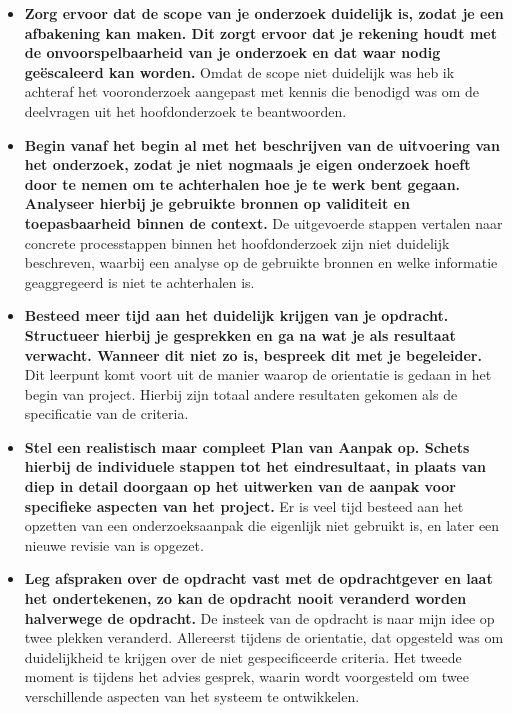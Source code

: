 \begin{itemize}
  \item \textbf{Zorg ervoor dat de scope van je onderzoek duidelijk is, zodat je een afbakening kan maken. Dit zorgt ervoor dat je rekening houdt met de onvoorspelbaarheid van je onderzoek en dat waar nodig geëscaleerd kan worden.} Omdat de scope niet duidelijk was heb ik achteraf het vooronderzoek aangepast met kennis die benodigd was om de deelvragen uit het hoofdonderzoek te beantwoorden.
  \item \textbf{Begin vanaf het begin al met het beschrijven van de uitvoering van het onderzoek, zodat je niet nogmaals je eigen onderzoek hoeft door te nemen om te achterhalen hoe je te werk bent gegaan. Analyseer hierbij je gebruikte bronnen op validiteit en toepasbaarheid binnen de context.} De uitgevoerde stappen vertalen naar concrete processtappen binnen het hoofdonderzoek zijn niet duidelijk beschreven, waarbij een analyse op de gebruikte bronnen en welke informatie geaggregeerd is niet te achterhalen is.
  \item \textbf{Besteed meer tijd aan het duidelijk krijgen van je opdracht. Structueer hierbij je gesprekken en ga na wat je als resultaat verwacht. Wanneer dit niet zo is, bespreek dit met je begeleider.} Dit leerpunt komt voort uit de manier waarop de orientatie is gedaan in het begin van project. Hierbij zijn totaal andere resultaten gekomen als de specificatie van de criteria.
  \item \textbf{Stel een realistisch maar compleet Plan van Aanpak op. Schets hierbij de individuele stappen tot het eindresultaat, in plaats van diep in detail doorgaan op het uitwerken van de aanpak voor specifieke aspecten van het project.} Er is veel tijd besteed aan het opzetten van een onderzoeksaanpak die eigenlijk niet gebruikt is, en later een nieuwe revisie van is opgezet.
  
  \newpage
  \item \textbf{Leg afspraken over de opdracht vast met de opdrachtgever en laat het ondertekenen, zo kan de opdracht nooit veranderd worden halverwege de opdracht.} De insteek van de opdracht is naar mijn idee op twee plekken veranderd. Allereerst tijdens de orientatie, dat opgesteld was om duidelijkheid te krijgen over de niet gespecificeerde criteria. Het tweede moment is tijdens het advies gesprek, waarin wordt voorgesteld om twee verschillende aspecten van het systeem te ontwikkelen.
\end{itemize}

